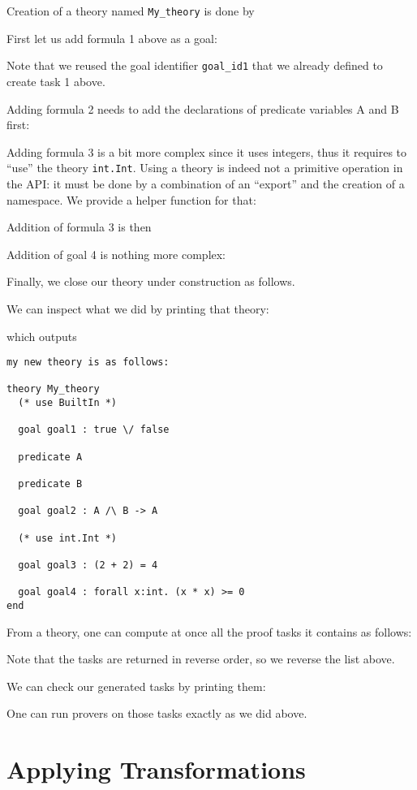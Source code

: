 Creation of a theory named \verb|My_theory| is done by

First let us add formula 1 above as a goal:

Note that we reused the goal identifier \verb|goal_id1| that we
already defined to create task 1 above.

Adding formula 2 needs to add the declarations of predicate variables A
and B first:


Adding formula 3 is a bit more complex since it uses integers, thus it
requires to ``use'' the theory \verb|int.Int|. Using a theory is
indeed not a primitive operation in the API: it must be done by a
combination of an ``export'' and the creation of a namespace. We
provide a helper function for that:

Addition of formula 3 is then


Addition of goal 4 is nothing more complex:


Finally, we close our theory under construction as follows.


We can inspect what we did by printing that theory:

which outputs
\begin{verbatim}
my new theory is as follows:

theory My_theory
  (* use BuiltIn *)

  goal goal1 : true \/ false

  predicate A

  predicate B

  goal goal2 : A /\ B -> A

  (* use int.Int *)

  goal goal3 : (2 + 2) = 4

  goal goal4 : forall x:int. (x * x) >= 0
end
\end{verbatim}

From a theory, one can compute at once all the proof tasks it contains
as follows:

Note that the tasks are returned in reverse order, so we reverse the
list above.

We can check our generated tasks by printing them:


One can run provers on those tasks exactly as we did above.

\section{Applying Transformations}

